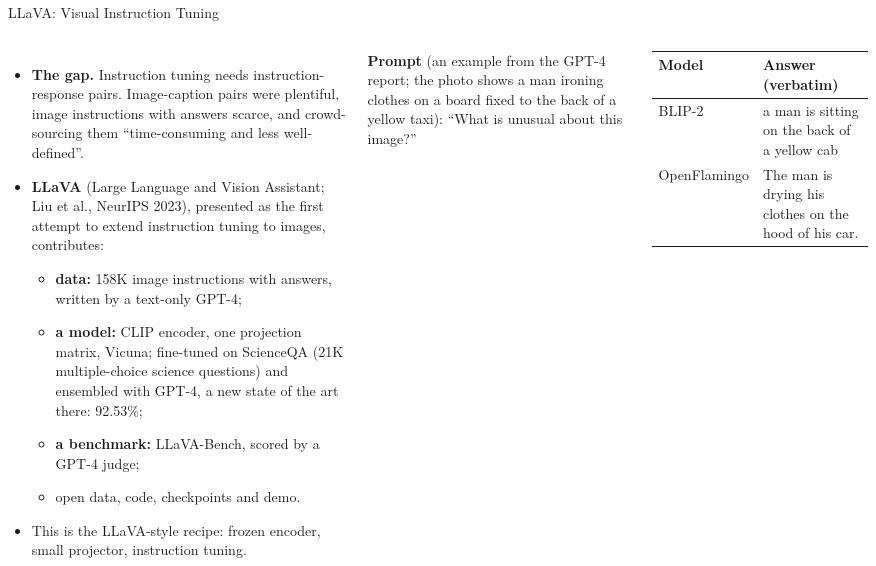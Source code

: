\begin{frame}{LLaVA: Visual Instruction Tuning}
  \begin{columns}[T,onlytextwidth]
      \begin{itemize}\footnotesize\itemsep0.35em
        \item \textbf{The gap.} Instruction tuning needs instruction-response pairs. Image-caption pairs were plentiful, image instructions with answers scarce, and crowd-sourcing them ``time-consuming and less well-defined''.
        \item \textbf{LLaVA} (Large Language and Vision Assistant; Liu et al., NeurIPS 2023), presented as the first attempt to extend instruction tuning to images, contributes:
        \begin{itemize}\scriptsize\itemsep0.1em
          \item \textbf{data:} 158K image instructions with answers, written by a text-only GPT-4;
          \item \textbf{a model:} CLIP encoder, one projection matrix, Vicuna; fine-tuned on ScienceQA (21K multiple-choice science questions) and ensembled with GPT-4, a new state of the art there: 92.53\%;
          \item \textbf{a benchmark:} LLaVA-Bench, scored by a GPT-4 judge;
          \item open data, code, checkpoints and demo.
        \end{itemize}
        \item This is the LLaVA-style recipe: frozen encoder, small projector, instruction tuning.
      \end{itemize}
      {\scriptsize\raggedright \textbf{Prompt} (an example from the GPT-4 report; the photo shows a man ironing clothes on a board fixed to the back of a yellow taxi): ``What is unusual about this image?''\par}
      \vspace{0.4em}
      \centering
      {\scriptsize\setlength{\tabcolsep}{4pt}
      \begin{tabular}{>{\raggedright\arraybackslash}p{1.7cm} >{\raggedright\arraybackslash}p{4.1cm}}
        \toprule
        \textbf{Model} & \textbf{Answer (verbatim)} \\
        \midrule
        BLIP-2 & a man is sitting on the back of a yellow cab \\
        \addlinespace[0.2em]
        OpenFlamingo & The man is drying his clothes on the hood of his car. \\

\end{tabular}}
\end{columns}
\end{frame}
